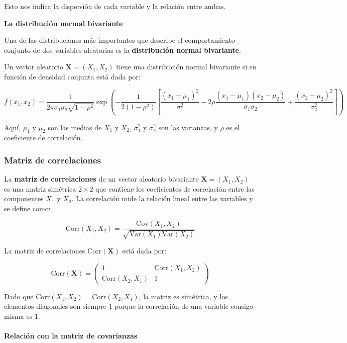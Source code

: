 \documentclass[
]{article}
\begin{document}
Esto nos indica la dispersión de cada variable y la relación entre ambas.

\textbf{La distribución normal bivariante}

Una de las distribuciones más importantes que describe el comportamiento conjunto de dos variables aleatorias es la \textbf{distribución normal bivariante}.

Un vector aleatorio \(\mathbf{X}=(X_1,X_2)\) tiene una distribución normal bivariante si su función de densidad conjunta está dada por:

\[
f(x_1,x_2)=\frac{1}{2\pi\sigma_1\sigma_2\sqrt{1-\rho^2}}\exp\left(-\frac{1}{2(1-\rho^2)}\left[\frac{(x_1-\mu_1)^2}{\sigma_1^2}-2\rho\frac{(x_1-\mu_1)(x_2-\mu_2)}{\sigma_1\sigma_2}+\frac{(x_2-\mu_2)^2}{\sigma_2^2}\right]\right)
\]

Aquí, \(\mu_1\) y \(\mu_2\) son las medias de \(X_1\) y \(X_2\), \(\sigma_1^2\) y \(\sigma_2^2\) son las varianzas, y \(\rho\) es el coeficiente de correlación.

\subsubsection{Matriz de correlaciones}\label{matriz-de-correlaciones}

La \textbf{matriz de correlaciones} de un vector aleatorio bivariante \(\mathbf{X}=(X_1,X_2)\) es una matriz simétrica \(2\times 2\) que contiene los coeficientes de correlación entre las componentes \(X_1\) y \(X_2\). La correlación mide la relación lineal entre las variables y se define como:

\[
\text{Corr}(X_1,X_2)=\frac{\text{Cov}(X_1,X_2)}{\sqrt{\text{Var}(X_1)\text{Var}(X_2)}}
\]

La matriz de correlaciones \(\text{Corr}(\mathbf{X})\) está dada por:

\[
\text{Corr}(\mathbf{X})=
\begin{pmatrix}
1 & \text{Corr}(X_1,X_2)\\
\text{Corr}(X_2,X_1) & 1
\end{pmatrix}
\]

Dado que \(\text{Corr}(X_1,X_2)=\text{Corr}(X_2,X_1)\), la matriz es simétrica, y los elementos diagonales son siempre \(1\) porque la correlación de una variable consigo misma es \(1\).

\paragraph{Relación con la matriz de covarianzas}\label{relaciuxf3n-con-la-matriz-de-covarianzas}
\end{document}
